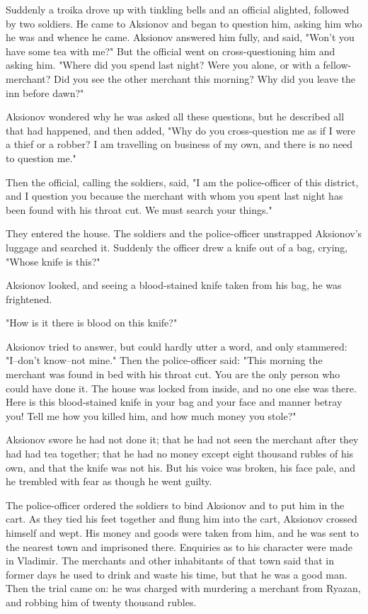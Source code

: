 Suddenly a troika drove up with tinkling bells and an official
alighted, followed by two soldiers. He came to Aksionov and began to
question him, asking him who he was and whence he came. Aksionov
answered him fully, and said, "Won't you have some tea with me?" But
the official went on cross-questioning him and asking him. "Where did
you spend last night? Were you alone, or with a fellow-merchant? Did
you see the other merchant this morning? Why did you leave the inn
before dawn?"

Aksionov wondered why he was asked all these questions, but he
described all that had happened, and then added, "Why do you
cross-question me as if I were a thief or a robber? I am travelling on
business of my own, and there is no need to question me."

Then the official, calling the soldiers, said, "I am the
police-officer of this district, and I question you because the
merchant with whom you spent last night has been found with his throat
cut. We must search your things."

They entered the house. The soldiers and the police-officer unstrapped
Aksionov's luggage and searched it. Suddenly the officer drew a knife
out of a bag, crying, "Whose knife is this?"

Aksionov looked, and seeing a blood-stained knife taken from his bag,
he was frightened.

"How is it there is blood on this knife?"

Aksionov tried to answer, but could hardly utter a word, and only
stammered: "I--don't know--not mine." Then the police-officer said:
"This morning the merchant was found in bed with his throat cut. You
are the only person who could have done it. The house was locked from
inside, and no one else was there. Here is this blood-stained knife in
your bag and your face and manner betray you! Tell me how you killed
him, and how much money you stole?"

Aksionov swore he had not done it; that he had not seen the merchant
after they had had tea together; that he had no money except eight
thousand rubles of his own, and that the knife was not his. But his
voice was broken, his face pale, and he trembled with fear as though
he went guilty.

The police-officer ordered the soldiers to bind Aksionov and to put
him in the cart. As they tied his feet together and flung him into the
cart, Aksionov crossed himself and wept. His money and goods were
taken from him, and he was sent to the nearest town and imprisoned
there. Enquiries as to his character were made in Vladimir. The
merchants and other inhabitants of that town said that in former days
he used to drink and waste his time, but that he was a good man. Then
the trial came on: he was charged with murdering a merchant from
Ryazan, and robbing him of twenty thousand rubles.

